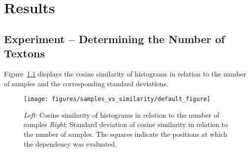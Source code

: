 \chapter{Results}
\label{chap:results}

\section{Experiment -- Determining the Number of Textons}

Figure~\ref{fig:cosine} displays the cosine similarity of histograms
in relation to the number of samples and the corresponding standard
deviations.

\begin{figure}[h!]
\begin{center}
\texttt{[image: figures/samples\_vs\_similarity/default\_figure]}
\caption{{\label{fig:cosine} \emph{Left}:
    Cosine similarity of histograms in relation to the number of
    samples \emph{Right}: Standard deviation of cosine similarity in
    relation to the number of samples. The squares indicate the
    positions at which the dependency was evaluated.%
}}
\end{center}
\end{figure}
